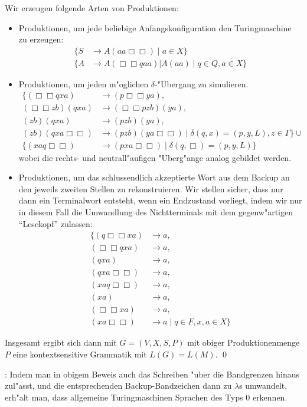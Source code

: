 {  Wir erzeugen folgende Arten von Produktionen:
  \begin{itemize}
    \item Produktionen, um jede beliebige Anfangskonfiguration den 
      Turingmaschine zu erzeugen:
      \begin{align*}
        \{S&\to A(aa\Box\Box)\mid a\in X\}\\
        \{A&\to A(\Box\Box q a a)|A(aa)\mid q\in Q,a\in X\}
        \end{align*}
    \item Produktionen, um jeden m"oglichen $\delta$-"Ubergang zu 
      simulieren. 
      \begin{align*}
        \{(\Box\Box qxa)&\to(p\Box\Box ya),\\
        (\Box\Box zb)(qxa)&\to(\Box\Box pzb)(ya),\\
        (zb)(qxa)&\to(pzb)(ya),\\
        (zb)(qxa\Box\Box)&\to(pzb)(ya\Box\Box)\mid \delta(q,x)=(p,y,L),z\in\Gamma\} \cup \\
        \{(xaq\Box\Box)&\to(pxa\Box\Box)\mid \delta(q,\Box)=(p,y,L)\}
        \end{align*}
      wobei die rechts- und neutrall"aufigen "Uberg"ange analog gebildet 
      werden.
    \item Produktionen, um das schlussendlich akzeptierte Wort aus dem
      Backup an den jeweils zweiten Stellen zu rekonstruieren. Wir stellen
      sicher, dass nur dann ein Terminalwort entsteht, wenn ein Endzustand
      vorliegt, indem wir nur in diesem Fall die Umwandlung des Nichtterminals
      mit dem gegenw"artigen ``Lesekopf'' zulassen:
      \begin{align*}
        \{(q\Box\Box xa)&\to a,\\
        (\Box\Box qxa)&\to a,\\
        (qxa)&\to a,\\
        (qxa\Box\Box)&\to a,\\
        (xaq\Box\Box)&\to a,\\
        (xa)&\to a,\\
        (\Box\Box xa)&\to a,\\
        (xa\Box\Box)&\to a\mid q\in F,x,a\in X\}
        \end{align*}
    \end{itemize}
  Insgesamt ergibt sich dann mit $G=(V,X,S,P)$ mit obiger 
  Produktionenmenge $P$ eine kontextsensitive Grammatik mit $L(G)=L(M)$.
  \qed
  }
\remark:{
  Indem man in obigem Beweis auch das Schreiben "uber die Bandgrenzen hinaus
  zul"asst, und die entsprechenden Backup-Bandzeichen dann zu $\lambda$s 
  umwandelt, erh"alt man, dass allgemeine Turingmaschinen Sprachen
  des Typs $0$ erkennen.
  }
